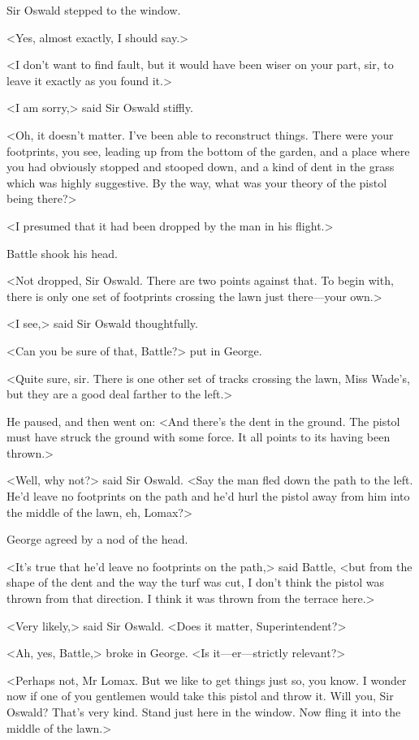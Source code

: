 Sir Oswald stepped to the window.

<Yes, almost exactly, I should say.>

<I don't want to find fault, but it would have been wiser on your part, sir, to leave it exactly as you found it.>

<I am sorry,> said Sir Oswald stiffly.

<Oh, it doesn't matter. I've been able to reconstruct things. There were your footprints, you see, leading up from the bottom of the garden, and a place where you had obviously stopped and stooped down, and a kind of dent in the grass which was highly suggestive. By the way, what was your theory of the pistol being there?>

<I presumed that it had been dropped by the man in his flight.>

Battle shook his head.

<Not dropped, Sir Oswald. There are two points against that. To begin with, there is only one set of footprints crossing the lawn just there—your own.>

<I see,> said Sir Oswald thoughtfully.

<Can you be sure of that, Battle?> put in George.

<Quite sure, sir. There is one other set of tracks crossing the lawn, Miss Wade's, but they are a good deal farther to the left.>

He paused, and then went on: <And there's the dent in the ground. The pistol must have struck the ground with some force. It all points to its having been thrown.>

<Well, why not?> said Sir Oswald. <Say the man fled down the path to the left. He'd leave no footprints on the path and he'd hurl the pistol away from him into the middle of the lawn, eh, Lomax?>

George agreed by a nod of the head.

<It's true that he'd leave no footprints on the path,> said Battle, <but from the shape of the dent and the way the turf was cut, I don't think the pistol was thrown from that direction. I think it was thrown from the terrace here.>

<Very likely,> said Sir Oswald. <Does it matter, Superintendent?>

<Ah, yes, Battle,> broke in George. <Is it—er—strictly relevant?>

<Perhaps not, Mr Lomax. But we like to get things just so, you know. I wonder now if one of you gentlemen would take this pistol and throw it. Will you, Sir Oswald? That's very kind. Stand just here in the window. Now fling it into the middle of the lawn.>

